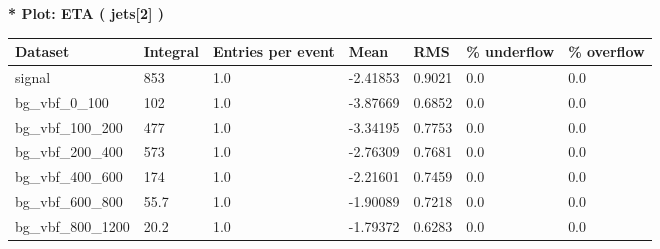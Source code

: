 \documentclass[a4paper, 10pt]{article}
\begin{document}
\textbf{* Plot: ETA ( jets[2] ) }\\
   \begin{table}[H]
  \begin{center}
    \begin{tabular}{|m{23.0mm}|m{23.0mm}|m{18.0mm}|m{19.0mm}|m{19.0mm}|m{19.0mm}|m{19.0mm}|}
      \hline
      {\cellcolor{yellow}         Dataset}& {\cellcolor{yellow}         Integral}& {\cellcolor{yellow}         Entries per event}& {\cellcolor{yellow}         Mean}& {\cellcolor{yellow}         RMS}& {\cellcolor{yellow}         \% underflow}& {\cellcolor{yellow}         \% overflow}\\
      \hline
      {\cellcolor{white}         signal}& {\cellcolor{white}         853}& {\cellcolor{white}         1.0}& {\cellcolor{white}         -2.41853}& {\cellcolor{white}         0.9021}& {\cellcolor{green}         0.0}& {\cellcolor{green}         0.0}\\
      \hline
      {\cellcolor{white}         bg\_vbf\_0\_100}& {\cellcolor{white}         102}& {\cellcolor{white}         1.0}& {\cellcolor{white}         -3.87669}& {\cellcolor{white}         0.6852}& {\cellcolor{green}         0.0}& {\cellcolor{green}         0.0}\\
      \hline
      {\cellcolor{white}         bg\_vbf\_100\_200}& {\cellcolor{white}         477}& {\cellcolor{white}         1.0}& {\cellcolor{white}         -3.34195}& {\cellcolor{white}         0.7753}& {\cellcolor{green}         0.0}& {\cellcolor{green}         0.0}\\
      \hline
      {\cellcolor{white}         bg\_vbf\_200\_400}& {\cellcolor{white}         573}& {\cellcolor{white}         1.0}& {\cellcolor{white}         -2.76309}& {\cellcolor{white}         0.7681}& {\cellcolor{green}         0.0}& {\cellcolor{green}         0.0}\\
      \hline
      {\cellcolor{white}         bg\_vbf\_400\_600}& {\cellcolor{white}         174}& {\cellcolor{white}         1.0}& {\cellcolor{white}         -2.21601}& {\cellcolor{white}         0.7459}& {\cellcolor{green}         0.0}& {\cellcolor{green}         0.0}\\
      \hline
      {\cellcolor{white}         bg\_vbf\_600\_800}& {\cellcolor{white}         55.7}& {\cellcolor{white}         1.0}& {\cellcolor{white}         -1.90089}& {\cellcolor{white}         0.7218}& {\cellcolor{green}         0.0}& {\cellcolor{green}         0.0}\\
      \hline
      {\cellcolor{white}         bg\_vbf\_800\_1200}& {\cellcolor{white}         20.2}& {\cellcolor{white}         1.0}& {\cellcolor{white}         -1.79372}& {\cellcolor{white}         0.6283}& {\cellcolor{green}         0.0}& {\cellcolor{green}         0.0}\\

\end{tabular}
\end{center}
\end{table}
\end{document}
